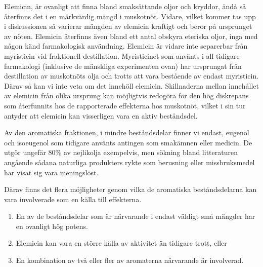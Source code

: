 \documentclass[a4paper,margin=3.25cm]{article}
\begin{document}
{Elemicin, är ovanligt att finna bland smaksättande oljor och kryddor, ändå så
återfinns det i en märkvärdig mängd i muskotnöt. Vidare, vilket kommer tas upp i diskussionen så varierar mängden av elemicin kraftigt och beror på ursprunget av nöten. Elemicin återfinns även bland ett antal obskyra eteriska oljor, inga med någon känd farmakologisk användning. Elemicin är vidare inte separerbar från myristicin vid fraktionell destillation. Myristicinet som använts i all tidigare farmakologi (inklusive de mänskliga experimenten ovan) har ursprungat från destillation av muskotnöts olja och trotts att vara bestående av endast myristicin. Därav så kan vi inte veta om det innehöll elemicin.
Skillnaderna mellan innehållet av elemicin från olika ursprung kan möjligtvis redogöra för den hög diskrepans som återfunnits hos de rapporterade effekterna hos muskotnöt, vilket i sin tur antyder att elemicin kan visserligen vara en aktiv beståndsdel.

Av den aromatiska fraktionen, i mindre beståndsdelar finner vi endast, eugenol och isoeugenol som tidigare använts antingen som smakämnen eller medicin.
De utgör ungefär 80\% av nejlikolja exempelvis, men sökning bland litteraturen angående sådana naturliga produkters rykte som berusning eller missbruksmedel har visat sig vara meningslöst.

Därav finns det flera möjligheter genom vilka de aromatiska beståndsdelarna kan vara involverade som en källa till effekterna.
\begin{enumerate}
	\setlength\itemsep{0em}
\item En av de beståndsdelar som är närvarande i endast väldigt små mängder har en ovanligt hög potens.
\item Elemicin kan vara en större källa av aktivitet än tidigare trott, eller
\item En kombination av två eller fler av aromaterna närvarande är involverad.
\end{enumerate}





%





}
\end{document}
